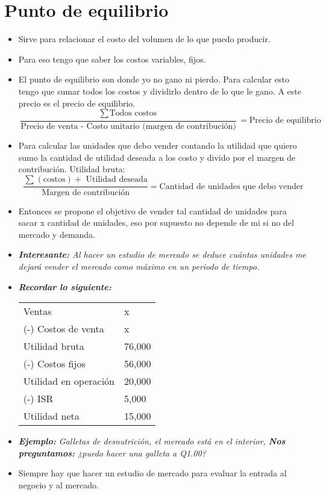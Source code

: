 \section{Punto de equilibrio}
\begin{itemize}
    \item Sirve para relacionar el costo del volumen de lo que puedo producir.
    \item Para eso tengo que saber los costos variables, fijos.
    \item El punto de equilibrio son donde yo no gano ni pierdo. Para calcular esto tengo que sumar todos los costos y dividirlo dentro de lo que le gano. A este precio es el precio de equilibrio.
        \[
          \frac{\sum_{}^{}\text{Todos costos}}{\text{Precio de venta - Costo unitario (margen de contribución)}} = \text{Precio de equilibrio}
        \]
        
    \item Para calcular las unidades que debo vender contando la utilidad que quiero sumo la cantidad de utilidad deseada a los costo y divido por el margen de contribución. Utilidad bruta: 
        \[
        \frac{\sum_{}^{}(\text{costos}) + \text{ Utilidad deseada} }{\text{Margen de contribución}} = \text{Cantidad de unidades que debo vender}
        \]
    
    \item Entonces se propone el objetivo de vender tal cantidad de unidades para sacar x cantidad de unidades, eso por supuesto no depende de mi si no del mercado y demanda.
    \item \emph{\textbf{Interesante:} Al hacer un estudio de mercado se deduce cuántas unidades me dejará vender el mercado como máximo en un periodo de tiempo.}
    \item \emph{\textbf{Recordar lo siguiente: }}
        \begin{center}
           \begin{tabular}{ | p{5cm} | p{5cm} | }
               \hline
                    Ventas & x    \\
                    (-) Costos de venta & x \\ 
               \hline
                    Utilidad bruta & 76,000 \\ 
                    (-) Costos fijos & 56,000 \\ 
                \hline
                    Utilidad en operación & 20,000 \\ 
                    (-) ISR & 5,000 \\ 
                    Utilidad neta & 15,000 \\ 
                \hline
           \end{tabular}
        \end{center}
    
    \item \emph{\textbf{Ejemplo: }Galletas de desnutrición, el mercado está en el interior, \textbf{Nos preguntamos:} ¿puedo hacer una galleta a Q1.00?}
    \item Siempre hay que hacer un estudio de mercado para evaluar la entrada al negocio y al mercado.
\end{itemize}

